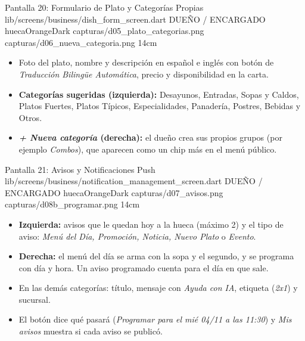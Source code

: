 \pantalladoble
  {Pantalla 20: Formulario de Plato y Categorías Propias}
  {lib/screens/business/dish\_form\_screen.dart}
  {DUEÑO / ENCARGADO}
  {huecaOrangeDark}
  {capturas/d05_plato_categorias.png}
  {capturas/d06_nueva_categoria.png}
  {14cm}
  {
    \begin{itemize}[leftmargin=*, itemsep=2pt]
      \item Foto del plato, nombre y descripción en español e inglés con botón de \textit{Traducción Bilingüe Automática}, precio y disponibilidad en la carta.
      \item \textbf{Categorías sugeridas (izquierda):} Desayunos, Entradas, Sopas y Caldos, Platos Fuertes, Platos Típicos, Especialidades, Panadería, Postres, Bebidas y Otros.
      \item \textbf{\textit{+ Nueva categoría} (derecha):} el dueño crea sus propios grupos (por ejemplo \textit{Combos}), que aparecen como un chip más en el menú público.
    \end{itemize}
  }

\pantalladoble
  {Pantalla 21: Avisos y Notificaciones Push}
  {lib/screens/business/notification\_management\_screen.dart}
  {DUEÑO / ENCARGADO}
  {huecaOrangeDark}
  {capturas/d07_avisos.png}
  {capturas/d08b_programar.png}
  {14cm}
  {
    \begin{itemize}[leftmargin=*, itemsep=2pt]
      \item \textbf{Izquierda:} avisos que le quedan hoy a la hueca (máximo 2) y el tipo de aviso: \textit{Menú del Día, Promoción, Noticia, Nuevo Plato} o \textit{Evento}.
      \item \textbf{Derecha:} el menú del día se arma con la sopa y el segundo, y se programa con día y hora. Un aviso programado cuenta para el día en que sale.
      \item En las demás categorías: título, mensaje con \textit{Ayuda con IA}, etiqueta (\textit{2x1}) y sucursal.
      \item El botón dice qué pasará (\textit{Programar para el mié 04/11 a las 11:30}) y \textit{Mis avisos} muestra si cada aviso se publicó.
    \end{itemize}
  }

